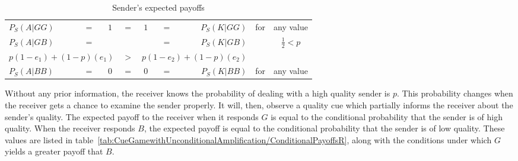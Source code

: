 \documentclass[a4paper,12pt]{article}
\numberwithin{equation}{section}
\begin{document}
\begin{table}[h]
\begin{center}
\begin{tabular}{lcccccrcc}
$P_{S}(A|GG)$ & $=$ & $1$ & $=$ & $1$ & $=$ & $P_{S}(K|GG)$ & \hspace{2mm} for & any value\\
$P_{S}(A|GB)$ & $=$ & \hspace{22mm} & & \hspace{22mm} & $=$ & $P_{S}(K|GB)$ & \hspace{2mm} \multirow{2}{*}{for} & \multirow{2}{*}{$\frac{1}{2}<p$}
\vspace{-1mm}\\
\multicolumn{3}{r}{$p(1-e_{1})+(1-p)(e_{1})$} & $>$ & \multicolumn{3}{l}{$p(1-e_{2})+(1-p)(e_{2})$} & & 
\vspace{1mm}\\
$P_{S}(A|BB)$ & $=$ & $0$ & $=$ & $0$ & $=$ & $P_{S}(K|BB)$ & \hspace{2mm} for & any value
\end{tabular}
\end{center}
\caption{Sender's expected payoffs}
\label{tab:CueGamewithUnconditionalAmplification/ConditionalPayoffsS}
\end{table}

Without any prior information, the receiver knows the probability of dealing with a high quality sender is $p$. This probability changes when the receiver gets a chance to examine the sender properly. It will, then, observe a quality cue which partially informs the receiver about the sender's quality. The expected payoff to the receiver when it responds $G$ is equal to the conditional probability that the sender is of high quality. When the receiver responds $B$, the expected payoff is equal to the conditional probability that the sender is of low quality. These values are listed in table~\ref{tab:CueGamewithUnconditionalAmplification/ConditionalPayoffsR}, along with the conditions under which $G$ yields a greater payoff that $B$.
\end{document}
